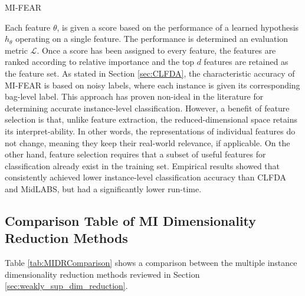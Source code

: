 \begin{algorithm}[h!]
	\caption{MI-FEAR}
	\label{alg:MIFEAR}
	\begin{algorithmic}[1]
		\EndFor             
	\end{algorithmic}
\end{algorithm}
\noindent
Each feature $\theta$, is given a score based on the performance of a learned hypothesis $h_{\theta}$ operating on a single feature.  The performance is determined an evaluation metric $\mathcal{L}$.  Once a score has been assigned to every feature, the features are ranked according to relative importance and the top $d$ features are retained as the feature set.  As stated in Section \ref{sec:CLFDA}, the characteristic accuracy of MI-FEAR is based on noisy labels, where each instance is given its corresponding bag-level label.  This approach has proven non-ideal in the literature for determining accurate instance-level classification.  However, a benefit of feature selection is that, unlike feature extraction, the reduced-dimensional space retains its interpret-ability.  In other words, the representations of individual features do not change, meaning they keep their real-world relevance, if applicable.  On the other hand, feature selection requires that a subset of useful features for classification already exist in the training set.  Empirical results showed that consistently achieved lower instance-level classification accuracy than CLFDA and MidLABS, but had a significantly lower run-time.

\subsection{Comparison Table of MI Dimensionality Reduction Methods}
Table \ref{tab:MIDRComparison} shows a comparison between the multiple instance dimensionality reduction methods reviewed in Section \ref{sec:weakly_sup_dim_reduction}.

